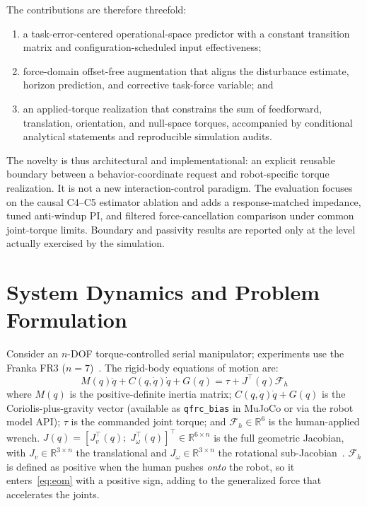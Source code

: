\documentclass[journal]{IEEEtran}
\begin{document}
The contributions are therefore threefold:

\begin{enumerate}[leftmargin=*,itemsep=2pt,topsep=2pt]
\item a task-error-centered operational-space predictor with a constant
transition matrix and configuration-scheduled input effectiveness;
\item force-domain offset-free augmentation that aligns the disturbance
estimate, horizon prediction, and corrective task-force variable; and
\item an applied-torque realization that constrains the sum of feedforward,
translation, orientation, and null-space torques, accompanied by conditional
analytical statements and reproducible simulation audits.
\end{enumerate}

The novelty is thus architectural and implementational: an explicit reusable
boundary between a behavior-coordinate request and robot-specific torque
realization.  It is not a new interaction-control paradigm.  The evaluation
focuses on the causal C4--C5 estimator ablation and adds a response-matched
impedance, tuned anti-windup PI, and filtered force-cancellation comparison
under common joint-torque limits.  Boundary and passivity results are reported
only at the level actually exercised by the simulation.

\section{System Dynamics and Problem Formulation}

Consider an $n$-DOF torque-controlled serial manipulator; experiments
use the Franka FR3 ($n=7$)~\cite{franka2023fr3}.
The rigid-body equations of motion are:
\begin{equation}\label{eq:eom}
  M(q)\ddot{q}+C(q,\dot{q})\dot{q}+G(q)=\tau+J^\top(q)\mathcal{F}_h
\end{equation}
where $M(q)$ is the positive-definite inertia matrix;
$C(q,\dot{q})\dot{q}+G(q)$ is the Coriolis-plus-gravity vector
(available as \texttt{qfrc\_bias} in MuJoCo or via the robot model API);
$\tau$ is the commanded joint torque; and $\mathcal{F}_h\in\mathbb{R}^6$
is the human-applied wrench.
$J(q)=[J_v^\top(q);\;J_\omega^\top(q)]^\top\in\mathbb{R}^{6\times n}$
is the full geometric Jacobian, with $J_v\in\mathbb{R}^{3\times n}$ the
translational and $J_\omega\in\mathbb{R}^{3\times n}$ the rotational
sub-Jacobian~\cite{siciliano2009robotics}.
$\mathcal{F}_h$ is defined as positive when the human pushes
\emph{onto} the robot, so it enters~\eqref{eq:eom} with a positive
sign, adding to the generalized force that accelerates the joints.
\end{document}

